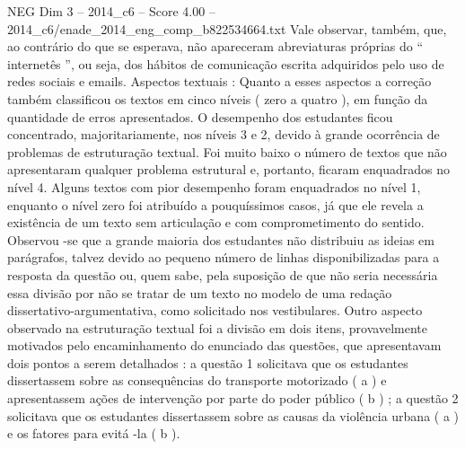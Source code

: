 \begin{textsample}{NEG Dim 3 – 2014\_c6 – Score 4.00 – 2014\_c6/enade\_2014\_eng\_comp\_b822534664.txt}
Vale observar, também, que, ao contrário do que se esperava, não apareceram abreviaturas próprias do “ internetês ”, ou seja, dos hábitos de comunicação escrita adquiridos pelo uso de redes sociais e emails.
Aspectos textuais : Quanto a esses aspectos a correção também classificou os textos em cinco níveis ( zero a quatro ), em função da quantidade de erros apresentados.
O desempenho dos estudantes ficou concentrado, majoritariamente, nos níveis 3 e 2, devido à grande ocorrência de problemas de estruturação textual.
Foi muito baixo o número de textos que não apresentaram qualquer problema estrutural e, portanto, ficaram enquadrados no nível 4.
Alguns textos com pior desempenho foram enquadrados no nível 1, enquanto o nível zero foi atribuído a pouquíssimos casos, já que ele revela a existência de um texto sem articulação e com comprometimento do sentido.
Observou -se que a grande maioria dos estudantes não distribuiu as ideias em parágrafos, talvez devido ao pequeno número de linhas disponibilizadas para a resposta da questão ou, quem sabe, pela suposição de que não seria necessária essa divisão por não se tratar de um texto no modelo de uma redação dissertativo-argumentativa, como solicitado nos vestibulares.
Outro aspecto observado na estruturação textual foi a divisão em dois itens, provavelmente motivados pelo encaminhamento do enunciado das questões, que apresentavam dois pontos a serem detalhados : a questão 1 solicitava que os estudantes dissertassem sobre as consequências do transporte motorizado ( a ) e apresentassem ações de intervenção por parte do poder público ( b ) ; a questão 2 solicitava que os estudantes dissertassem sobre as causas da violência urbana ( a ) e os fatores para evitá -la ( b ).

\end{textsample}
